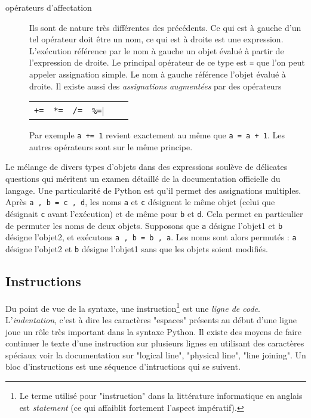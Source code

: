 \begin{description}
\item[opérateurs d'affectation] Ils sont de nature très différentes des précédents. Ce qui est à gauche d'un tel opérateur doit être un nom, ce qui est à droite est une expression. L'exécution référence par le nom à gauche un objet évalué à partir de l'expression de droite.\newline
Le principal opérateur de ce type est \verb|=| que l'on peut appeler assignation simple. Le nom à gauche référence l'objet évalué à droite.\newline
Il existe aussi des \emph{assignations augmentées} par des opérateurs
\begin{center}
\begin{tabular}{cccccc}
\verb|+=|  & \verb|*=| & \verb|/=|  & \verb|%=|
 \end{tabular}
 \end{center}
Par exemple \verb|a += 1| revient exactement au même que \verb|a = a + 1|. Les autres opérateurs sont sur le même principe.
\end{description}
Le mélange de divers types d'objets dans des expressions soulève de délicates questions qui méritent un examen détaillé de la documentation officielle du langage.\newline
Une particularité de Python est qu'il permet des assignations multiples.\newline
Après \verb|a , b = c , d|, les noms \verb|a| et \verb|c| désignent le même objet (celui que désignait \verb|c| avant l'exécution) et de même pour \verb|b| et \verb|d|. Cela permet en particulier de permuter les noms de deux objets.\newline
Supposons que \verb|a| désigne l'objet1 et \verb|b| désigne l'objet2, et exécutons \verb|a , b = b , a|. Les noms sont alors permutés : \verb|a| désigne l'objet2 et \verb|b| désigne l'objet1 sans que les objets soient modifiés.

\subsection{Instructions}
Du point de vue de la syntaxe, une instruction\footnote{Le terme utilisé pour "instruction" dans la littérature informatique en anglais est \emph{statement} (ce qui affaiblit fortement l'aspect impératif).} est une \emph{ligne de code}.\newline
L'\emph{indentation}, c'est à dire les caractères "espaces" présents au début d'une ligne joue un rôle très important dans la syntaxe Python.\newline
Il existe des moyens de faire continuer le texte d'une instruction sur plusieurs lignes en utilisant des caractères spéciaux voir la documentation sur "logical line", "physical line", "line joining".\newline
Un bloc d'instructions est une séquence d'intructions qui se suivent.
